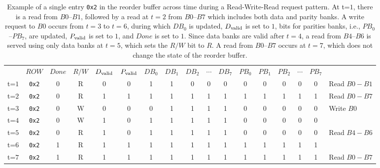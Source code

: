\begin{table}[t!]
 \small
  \centering
  \begin{tabular}{c|c|c|c|c|c|c|c|c|c|c|c|c|c|c|c|l}
    \cline{2-16}
&    $ROW$ & $Done$ & $R/W$ & $D_{\rm valid}$ & $P_{\rm valid}$ & $DB_{0}$ &  $DB_{1}$ & $DB_{2}$ &$\cdots$ & $DB_7$  & $PB_0$ &  $PB_{1}$ & $PB_{2}$ & $\cdots$ & $PB_7$ \\
    \cline{2-16}
t=$1$ &   \texttt{0x2} & 0 & R  & 0 & 0  & 1 & 1 & 0 & 0 & 0 & 0 & 0  & 0 & 0& 0 & {\scriptsize Read $B0 - B1$}\\
    \cline{2-16}
t=$2$ &    \texttt{0x2} & 0 & R & 1 & 1 & 1 & 1 & 1 & 1& 1 & 1& 1 &1 &1&1& {\scriptsize Read $B0 - B7$}\\
   \cline{2-16}                          
t=$3$ &    \texttt{0x2} & 0 & W & 0 & 0 & 0 & 1 & 1 & 1& 1 & 0 & 0 & 0 & 0 & 0 & {\scriptsize Write $B0$} \\
   \cline{2-16}                          
t=$4$ &    \texttt{0x2} & 0 & W & 1 & 0 & 1 & 1 & 1 & 1& 1 & 0 & 0 & 0 & 0 & 0& \\
    \cline{2-16}   
t=$5$ &    \texttt{0x2} & 0 & R & 1 & 0 & 1 & 1 & 1 & 1& 1 & 0 & 0 & 0 & 0 & 0 & {\scriptsize Read $B4 - B6$}\\
    \cline{2-16} 
t=$6$ &    \texttt{0x2} & 1 & R & 1 & 1 & 1 & 1 & 1 & 1& 1 & 1 & 1 & 1 & 1 & 1 &\\
    \cline{2-16} 
t=$7$ &    \texttt{0x2} & 1 & R & 1 & 1 & 1 & 1 & 1 & 1& 1 & 1 & 1 & 1 & 1 & 1 &{\scriptsize Read $B0 - B7$} \\
    \cline{2-16}                                                     
  \end{tabular}
  \caption{Example of a single entry \texttt{0x2} in the reorder buffer across time during a Read-Write-Read request pattern. At t=$1$, there is a read from $B0$--$B1$, followed by a read at $t=2$ from $B0$--$B7$ which includes both data and parity banks. A write request to $B0$ occurs from $t=3$ to $t=6$, during which $DB_0$ is updated, $D_{\rm valid}$ is set to $1$, bits for parities banks, i.e., $PB_0$--$PB_7$, are updated, $P_{\rm valid}$ is set to $1$, and $Done$ is set to $1$. Since data banks are valid after $t=4$, a read from $B{4} $--$B6$ is served using only data banks at $t=5$, which sets the $R/W$ bit to $R$. A read from $B0 $--$B7$ occurs at $t=7$, which does not change the state of the reorder buffer. }
  \label{fig:rob}
\end{table}

